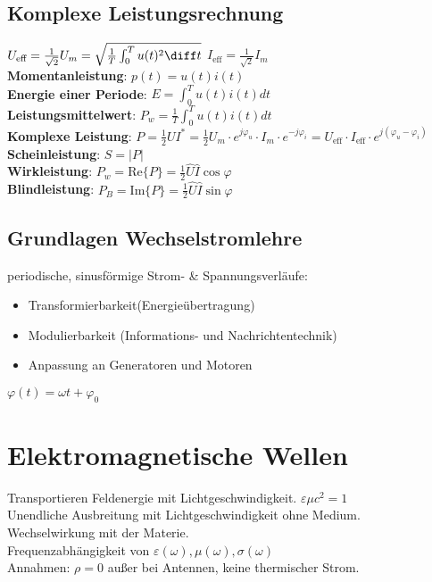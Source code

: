\documentclass[6pt,a4paper]{scrartcl}
\begin{document}
\begin{multicols}{4}
{	\subsection{Komplexe Leistungsrechnung}
	$U_{\text{eff}} = \frac{1}{\sqrt{2}}U_m = \sqrt{\frac{1}{T}\int_0^T u(t)^2\diff t}$\qquad
	$I_{\text{eff}} = \frac{1}{\sqrt{2}}I_m$\\
	\textbf{Momentanleistung}: $p(t) = u(t)i(t)$\\
	\textbf{Energie einer Periode}: $E=\int_0^Tu(t)i(t)dt$\\
	\textbf{Leistungsmittelwert}: $P_w = \frac{1}{T} \int_0^T u(t)i(t)dt$\\
	\textbf{Komplexe Leistung}: $P = \frac{1}{2}UI^* = \frac{1}{2}U_m\cdot e^{j\varphi_u}\cdot I_m\cdot e^{-j\varphi_i} = U_{\text{eff}}\cdot I_{\text{eff}}\cdot e^{j(\varphi_u-\varphi_i)}$\\
	\textbf{Scheinleistung}: $S = |P|$\\
	\textbf{Wirkleistung}: $P_w = \text{Re}\{P\} = \frac{1}{2}\hat U\hat I\cos \varphi$\\
	\textbf{Blindleistung}: $P_B = \text{Im}\{P\} = \frac{1}{2}\hat U\hat I\sin \varphi$
}

	\subsection{Grundlagen Wechselstromlehre}
	periodische, sinusförmige Strom- \& Spannungsverläufe:\\
	\begin{itemize}
		\item Transformierbarkeit(Energieübertragung) 
		\item Modulierbarkeit (Informations- und Nachrichtentechnik)
		\item Anpassung an Generatoren und Motoren
	\end{itemize}
	$\varphi(t) = \omega t + \varphi_0$ 

\section{Elektromagnetische Wellen}
Transportieren Feldenergie mit Lichtgeschwindigkeit. $\varepsilon \mu c^2 = 1$\\ 
Unendliche Ausbreitung mit Lichtgeschwindigkeit ohne Medium.\\
Wechselwirkung mit der Materie.\\
Frequenzabhängigkeit von $\varepsilon(\omega),\mu(\omega),\sigma(\omega)$\\
Annahmen: $\rho = 0$ außer bei Antennen, keine thermischer Strom.\\


\end{multicols}
\end{document}
